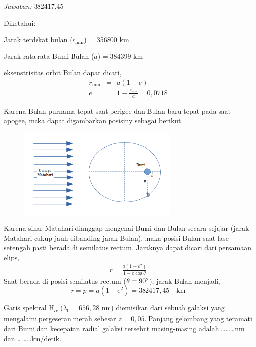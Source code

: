 \documentclass[11pt,fleqn]{exam}
\begin{document}
\begin{questions}
\textit{Jawaban: } 382417,45

Diketahui:

Jarak terdekat bulan ($r_{\text{min}}$) = 356800 km

Jarak rata-rata Bumi-Bulan ($a$) = 384399 km

eksenstrisitas orbit Bulan dapat dicari,
\begin{eqnarray*}
r_{\text{min}} &=& a (1 - e)\\
e &=& 1 - \frac{r_{\text{min}}}{a} = 0,0718
\end{eqnarray*}

Karena Bulan purnama tepat saat perigee dan Bulan baru tepat pada saat apogee, maka dapat digambarkan posisiny sebagai berikut.

\begin{figure}[ht!]
\centering
\includegraphics[width=0.7\textwidth]{19.png}
\end{figure}

Karena sinar Matahari dianggap mengenai Bumi dan Bulan secara sejajar (jarak Matahari cukup jauh dibanding jarak Bulan), maka posisi Bulan saat fase setengah pasti berada di semilatus rectum. Jaraknya dapat dicari dari persamaan elips,
\begin{eqnarray*}
r = \frac{a (1 - e^2)}{1-e \cos{\theta}}
\end{eqnarray*}
Saat berada di posisi semilatus rectum ($\theta = 90\degree$), jarak Bulan menjadi,
\begin{equation*}
r = p = a(1 - e^2) = 382417,45 \quad \text{km}
\end{equation*}

\vspace{0.3cm}
\question Garis spektral H\textsubscript{$\alpha$} ($\lambda_0=656,28$ nm) diemisikan dari sebuah galaksi yang mengalami pergeseran merah sebesar $z=0,05$. Panjang gelombang yang teramati dari Bumi dan kecepatan radial galaksi tersebut masing-masing adalah \ldots\ldots\ldots nm dan \ldots\ldots\ldots km/detik.\\


\end{questions}
\end{document}
